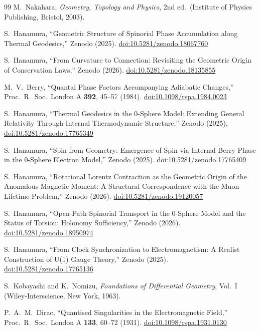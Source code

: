 \documentclass[%
 reprint, amsmath,amssymb, aps, prb, ]{revtex4-2}
\numberwithin{equation}{section}
\begin{document}
\begin{thebibliography}{99}
M.~Nakahara, \textit{Geometry, Topology and Physics}, 2nd ed.\ (Institute of Physics Publishing, Bristol, 2003).

S.~Hanamura, ``Geometric Structure of Spinorial Phase Accumulation along Thermal Geodesics,'' Zenodo (2025). \href{https://doi.org/10.5281/zenodo.18067760}{doi:10.5281/zenodo.18067760}

S.~Hanamura, ``From Curvature to Connection: Revisiting the Geometric Origin of Conservation Laws,'' Zenodo (2026). \href{https://doi.org/10.5281/zenodo.18135855}{doi:10.5281/zenodo.18135855}

M.~V.~Berry, ``Quantal Phase Factors Accompanying Adiabatic Changes,'' Proc.\ R.\ Soc.\ London A \textbf{392}, 45--57 (1984). \href{https://doi.org/10.1098/rspa.1984.0023}{doi:10.1098/rspa.1984.0023}

S.~Hanamura, ``Thermal Geodesics in the 0-Sphere Model: Extending General Relativity Through Internal Thermodynamic Structure,'' Zenodo (2025). \href{https://doi.org/10.5281/zenodo.17765349}{doi:10.5281/zenodo.17765349}

S.~Hanamura, ``Spin from Geometry: Emergence of Spin via Internal Berry Phase in the 0-Sphere Electron Model,'' Zenodo (2025). \href{https://doi.org/10.5281/zenodo.17765409}{doi:10.5281/zenodo.17765409}

S.~Hanamura, ``Rotational Lorentz Contraction as the Geometric Origin of the Anomalous Magnetic Moment: A Structural Correspondence with the Muon Lifetime Problem,'' Zenodo (2026). \href{https://doi.org/10.5281/zenodo.19120057}{doi:10.5281/zenodo.19120057}

S.~Hanamura, ``Open-Path Spinorial Transport in the 0-Sphere Model and the Status of Torsion: Holonomy Sufficiency,'' Zenodo (2026). \href{https://doi.org/10.5281/zenodo.18950974}{doi:10.5281/zenodo.18950974}

S.~Hanamura, ``From Clock Synchronization to Electromagnetism: A Realist Construction of U(1) Gauge Theory,'' Zenodo (2025). \href{https://doi.org/10.5281/zenodo.17765136}{doi:10.5281/zenodo.17765136}

S.~Kobayashi and K.~Nomizu, \textit{Foundations of Differential Geometry}, Vol.~I (Wiley-Interscience, New York, 1963).

P.~A.~M.~Dirac, ``Quantised Singularities in the Electromagnetic Field,'' Proc.\ R.\ Soc.\ London A \textbf{133}, 60--72 (1931). \href{https://doi.org/10.1098/rspa.1931.0130}{doi:10.1098/rspa.1931.0130}


\end{thebibliography}
\end{document}

